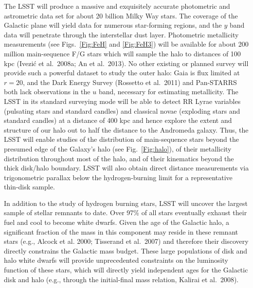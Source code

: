 \documentclass{emulateapj}
\begin{document}
The LSST will produce a massive and exquisitely accurate photometric and astrometric data set for about 20 billion 
Milky Way stars. The coverage of the Galactic plane will yield data for numerous star-forming 
regions, and the $y$ band data will penetrate through the interstellar dust layer. Photometric metallicity 
measurements (see Figs.~\ref{Fig:FeH} and \ref{Fig:FeH3}) will be available for about 200 million main-sequence 
F/G stars which will sample the halo to distances of 100 kpc (Ivezi\'{c} et al.~2008a; An et al.~2013). No other 
existing or planned survey will provide such a powerful dataset to
study the outer halo: Gaia
is flux limited at $r=20$, and the Dark Energy Survey (Rossetto et al.~2011) and Pan-STARRS both 
lack observations in the $u$ band, necessary for estimating metallicity. The LSST in its standard surveying mode will 
be able to detect RR Lyrae variables (pulsating stars and standard candles) and classical novae (exploding stars 
and standard candles) at a distance of 400 kpc and hence explore the extent and structure of our  halo out to 
half the distance to the Andromeda galaxy. Thus, the LSST will enable studies of the distribution of main-sequence 
stars beyond the presumed edge of the Galaxy's halo (see Fig.~\ref{Fig:halo}), of their metallicity distribution
throughout most of the halo, and of their kinematics beyond the thick disk/halo boundary. LSST will also obtain 
direct distance measurements via trigonometric parallax below the hydrogen-burning limit for a representative
thin-disk sample.


In addition to the study of hydrogen burning stars, LSST will uncover the largest sample of stellar remnants to date. 
Over 97\% of all stars eventually exhaust their fuel and cool to become white dwarfs. Given the age of the Galactic 
halo, a significant fraction of the mass in this component may reside in these remnant stars (e.g., Alcock et al.
2000; Tisserand et al.~2007) and therefore their discovery directly constrains the Galactic mass budget.  These large 
populations of disk and halo white dwarfs will provide unprecedented constraints on the luminosity function of
these stars, which will directly yield independent ages for the Galactic disk and halo (e.g., through the initial-final mass
relation, Kalirai et al.~2008).
\end{document}
